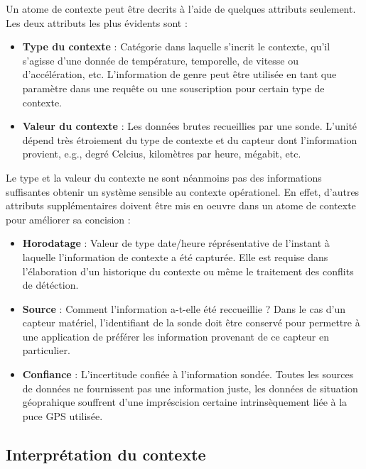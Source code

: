 Un atome de contexte peut être decrits à l'aide de quelques attributs seulement.
Les deux attributs les plus évidents sont :

\begin{itemize}
    \item \textbf{Type du contexte} :
	    Catégorie dans laquelle s'incrit le contexte, qu'il s'agisse d'une
	    donnée de température, temporelle, de vitesse ou d'accélération,
	    etc. L'information de genre peut être utilisée en tant que paramètre
	    dans une requête ou une souscription pour certain type de contexte. 
    \item \textbf{Valeur du contexte} : 
	    Les données brutes recueillies par une sonde. L'unité dépend très
	    étroiement du type de contexte et du capteur dont l'information
	    provient, e.g., degré Celcius, kilomètres par heure, mégabit, etc.
\end{itemize}

Le type et la valeur du contexte ne sont néanmoins pas des informations
suffisantes obtenir un système sensible au contexte opérationel. En effet,
d'autres attributs supplémentaires doivent être mis en oeuvre dans un atome de
contexte pour améliorer sa concision :

\begin{itemize}
    \item \textbf{Horodatage} :
	    Valeur de type date/heure réprésentative de l'instant à laquelle
	    l'information de contexte a été capturée. Elle est requise dans
	    l'élaboration d'un historique du contexte ou même le traitement des
	    conflits de détéction.
    \item \textbf{Source} :
	    Comment l'information a-t-elle été reccueillie ? Dans le cas d'un
	    capteur matériel, l'identifiant de la sonde doit être conservé pour
	    permettre à une application de préférer les information provenant
	    de ce capteur en particulier.
    \item \textbf{Confiance} :
	    L'incertitude confiée à l'information sondée. Toutes les sources
	    de données ne fournissent pas une information juste, les données de
	    situation géoprahique souffrent d'une impréscision certaine
	    intrinsèquement liée à la puce GPS utilisée.
\end{itemize}

\subsection{Interprétation du contexte}

